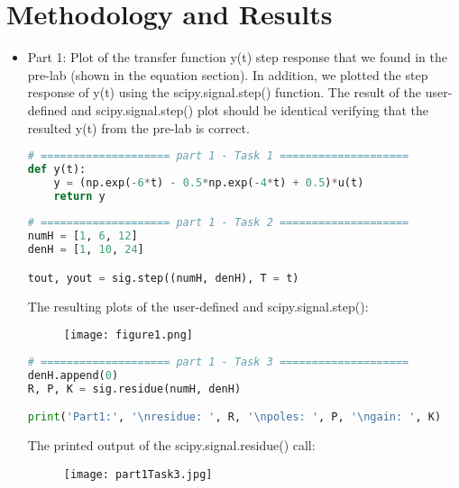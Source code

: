 \documentclass[12pt,a4paper]{article}
\begin{document}
\section{Methodology and Results}\label{sec:meth}

\begin{itemize}

    \item Part 1:
    Plot of the transfer function y(t) step response that we found in the pre-lab (shown in the equation section). In addition, we plotted the step response of y(t) using the scipy.signal.step() function. The result of the user-defined and scipy.signal.step() plot should be identical verifying that the resulted y(t) from the pre-lab is correct.\\
    
\begin{lstlisting}[language=Python, caption={user-defined and scipy.signal.step() step response}, label={lst:code}, mathescape=true, breaklines=true]
# ==================== part 1 - Task 1 ====================
def y(t):
    y = (np.exp(-6*t) - 0.5*np.exp(-4*t) + 0.5)*u(t)
    return y
    
# ==================== part 1 - Task 2 ====================
numH = [1, 6, 12]
denH = [1, 10, 24]

tout, yout = sig.step((numH, denH), T = t)
\end{lstlisting}
\clearpage

    The resulting plots of the user-defined and scipy.signal.step():
    
\begin{figure}[h]
    \centering
    \texttt{[image: figure1.png]}
\end{figure}\textbf{}
    
\begin{lstlisting}[language=Python, caption={using scipy.signal.residue() to pereform partial fraction expansion}, label={lst:code}, mathescape=true, breaklines=true]
# ==================== part 1 - Task 3 ====================
denH.append(0)
R, P, K = sig.residue(numH, denH)

print('Part1:', '\nresidue: ', R, '\npoles: ', P, '\ngain: ', K)
\end{lstlisting}
    
    The printed output of the scipy.signal.residue() call:
\begin{figure}[h]
    \centering
    \texttt{[image: part1Task3.jpg]}
\end{figure}\textbf{}
    

\end{itemize}
\end{document}
